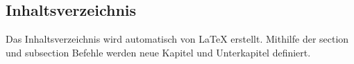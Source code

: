 \subsection{Inhaltsverzeichnis}

Das Inhaltsverzeichnis wird automatisch von LaTeX erstellt.
Mithilfe der section und subsection Befehle werden neue Kapitel und Unterkapitel definiert.
